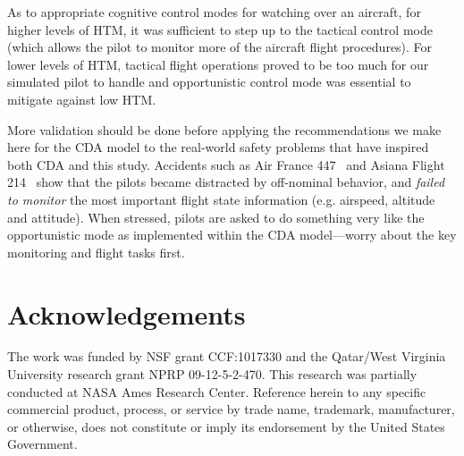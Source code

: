 \documentclass[journal]{IEEEtran}
\newenvironment{changed}{\par}{\par}
\begin{document}
As to appropriate cognitive control modes for watching over an aircraft, for higher levels of HTM, it was sufficient to step up to the tactical control mode (which allows the pilot to monitor more of the aircraft flight procedures).
For lower levels of HTM, tactical flight operations proved to be too much for our
simulated pilot to handle and opportunistic control mode was essential to mitigate against low HTM.

\begin{changed}
More validation should be done before applying the recommendations we make here for the CDA model to the real-world safety problems that have inspired both CDA and this study.
Accidents such as Air France 447~\cite{AirFranceFinal2012} and 
Asiana Flight 214~\cite{AsianaFinal2014} show that
the pilots became distracted by off-nominal behavior, and {\em failed to monitor} the most important flight state information (e.g. airspeed, altitude and attitude).
When stressed, pilots are asked to do something very like the opportunistic mode as implemented within the CDA model---worry about the key monitoring and flight tasks first.
\end{changed}




\section*{Acknowledgements}

The work was funded by NSF grant CCF:1017330 and the
Qatar/West Virginia University research grant NPRP
09-12-5-2-470.  This research was partially
conducted at NASA Ames Research Center. Reference
herein to any specific commercial product, process,
or service by trade name, trademark, manufacturer,
or otherwise, does not constitute or imply its
endorsement by the United States Government.
\end{document}
